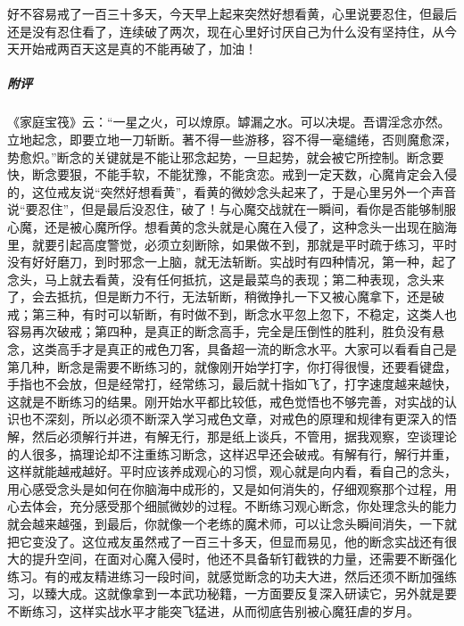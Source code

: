 \begin{case}
    好不容易戒了一百三十多天，今天早上起来突然好想看黄，心里说要忍住，但最后还是没有忍住看了，连续破了两次，现在心里好讨厌自己为什么没有坚持住，从今天开始戒两百天这是真的不能再破了，加油！
    \subparagraph{附评} 《家庭宝筏》云：“一星之火，可以燎原。罅漏之水。可以决堤。吾谓淫念亦然。立地起念，即要立地一刀斩断。著不得一些游移，容不得一毫缱绻，否则魔愈深，势愈炽。”断念的关键就是不能让邪念起势，一旦起势，就会被它所控制。断念要快，断念要狠，不能手软，不能犹豫，不能贪恋。戒到一定天数，心魔肯定会入侵的，这位戒友说“突然好想看黄”，看黄的微妙念头起来了，于是心里另外一个声音说“要忍住”，但是最后没忍住，破了！与心魔交战就在一瞬间，看你是否能够制服心魔，还是被心魔所俘。想看黄的念头就是心魔在入侵了，这种念头一出现在脑海里，就要引起高度警觉，必须立刻断除，如果做不到，那就是平时疏于练习，平时没有好好磨刀，到时邪念一上脑，就无法斩断。实战时有四种情况，第一种，起了念头，马上就去看黄，没有任何抵抗，这是最菜鸟的表现；第二种表现，念头来了，会去抵抗，但是断力不行，无法斩断，稍微挣扎一下又被心魔拿下，还是破戒；第三种，有时可以斩断，有时做不到，断念水平忽上忽下，不稳定，这类人也容易再次破戒；第四种，是真正的断念高手，完全是压倒性的胜利，胜负没有悬念，这类高手才是真正的戒色刀客，具备超一流的断念水平。大家可以看看自己是第几种，断念是需要不断练习的，就像刚开始学打字，你打得很慢，还要看键盘，手指也不会放，但是经常打，经常练习，最后就十指如飞了，打字速度越来越快，这就是不断练习的结果。刚开始水平都比较低，戒色觉悟也不够完善，对实战的认识也不深刻，所以必须不断深入学习戒色文章，对戒色的原理和规律有更深入的悟解，然后必须解行并进，有解无行，那是纸上谈兵，不管用，据我观察，空谈理论的人很多，搞理论却不注重练习断念，这样迟早还会破戒。有解有行，解行并重，这样就能越戒越好。平时应该养成观心的习惯，观心就是向内看，看自己的念头，用心感受念头是如何在你脑海中成形的，又是如何消失的，仔细观察那个过程，用心去体会，充分感受那个细腻微妙的过程。不断练习观心断念，你处理念头的能力就会越来越强，到最后，你就像一个老练的魔术师，可以让念头瞬间消失，一下就把它变没了。这位戒友虽然戒了一百三十多天，但显而易见，他的断念实战还有很大的提升空间，在面对心魔入侵时，他还不具备斩钉截铁的力量，还需要不断强化练习。有的戒友精进练习一段时间，就感觉断念的功夫大进，然后还须不断加强练习，以臻大成。这就像拿到一本武功秘籍，一方面要反复深入研读它，另外就是要不断练习，这样实战水平才能突飞猛进，从而彻底告别被心魔狂虐的岁月。
\end{case}

